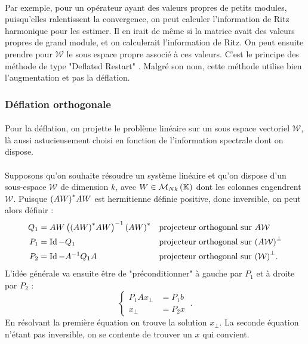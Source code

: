       \paragraph{}
      Par exemple, pour un opérateur ayant des valeurs propres de petits modules, puisqu'elles ralentissent la convergence, on peut calculer l'information de Ritz harmonique pour les estimer.
      Il en irait de même si la matrice avait des valeurs propres de grand module, et on calculerait l'information de Ritz.
      On peut ensuite prendre pour $\mathcal{W}$ le sous espace propre associé à ces valeurs.
      C'est le principe des méthode de type "Deflated Restart" \cite{Vasseur2016, Morgan2002, Pinel2010}.
      Malgré son nom, cette méthode utilise bien l'augmentation et pas la déflation.


    \subsubsection{Déflation orthogonale}

      \paragraph{}
      Pour la déflation, on projette le problème linéaire sur un sous espace vectoriel $\mathcal{W}$, là aussi astucieusement choisi en fonction de l'information spectrale dont on dispose.

      \paragraph{}
      Supposons qu'on souhaite résoudre un système linéaire et qu'on dispose d'un sous-espace $\mathcal{W}$ de dimension $k$, avec $W\in\mathcal{M}_{N k}\left(\mathbb{K}\right)$ dont les colonnes engendrent $\mathcal{W}$.
      Puisque ${\left(AW\right)}^*AW$ est hermitienne définie positive, donc inversible, on peut alors définir \cite{CoulaudGiraudRametEtAl2013} :
      \begin{align*}
        Q_1 &= AW\left({\left(AW\right)}^*AW\right)^{-1}{\left(AW\right)}^* &&\textrm{projecteur orthogonal sur $A\mathcal{W}$} \\
        P_1 &= \operatorname{Id} - Q_1 &&\textrm{projecteur orthogonal sur $\left(A\mathcal{W}\right)^\perp$} \\
        P_2 &= \operatorname{Id} - A^{-1}Q_1A &&\textrm{projecteur orthogonal sur $\left(\mathcal{W}\right)^\perp$.}
      \end{align*}
      L'idée générale va ensuite être de "préconditionner" à gauche par $P_1$ et à droite par $P_2$ :
      \begin{equation*}
        \left\{
        \begin{aligned}
          P_1Ax_\perp &= P_1b\\
          x_\perp &= P_2x
        \end{aligned}
        \right.\ .
      \end{equation*}
      En résolvant la première équation on trouve la solution $x_\perp$. La seconde équation n'étant pas inversible, on se contente de trouver un $x$ qui convient.

